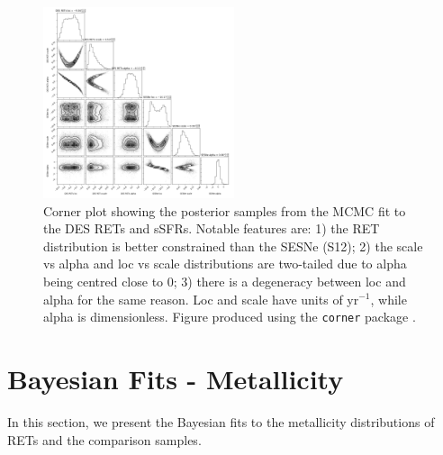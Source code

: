 \documentclass[fleqn,usenatbib,]{mnras}
\begin{document}
\begin{figure}
\includegraphics[width=0.5\textwidth]{mc_figs/rets_s12_ssfr_corner_final.png}
\caption{Corner plot showing the posterior samples from the MCMC fit to the DES RETs and \citet{Sanders2012} sSFRs. Notable features are: 1) the RET distribution is better constrained than the SESNe (S12); 2) the scale vs alpha and loc vs scale distributions are two-tailed due to alpha being centred close to 0; 3) there is a degeneracy between loc and alpha for the same reason. Loc and scale have units of yr$^{-1}$, while alpha is dimensionless. Figure produced using the \texttt{corner} package \citep{Foreman-Mackey2016}.
\label{fig:corner}}
\end{figure}

\section{Bayesian Fits - Metallicity}
\label{app:c}
In this section, we present the Bayesian fits to the metallicity distributions of RETs and the comparison samples.
\end{document}
